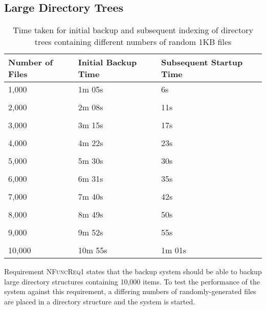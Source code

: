 \subsection{Large Directory Trees}

\begin{table}
    \centering
    \begin{tabular}{ l l l }
        Number of Files & Initial Backup Time   & Subsequent Startup Time
        \\ \toprule
        1,000           & 1m 05s                & 6s
        \\ \\
        2,000           & 2m 08s                & 11s
        \\ \\
        3,000           & 3m 15s                & 17s
        \\ \\
        4,000           & 4m 22s                & 23s
        \\ \\
        5,000           & 5m 30s                & 30s
        \\ \\
        6,000           & 6m 31s                & 35s
        \\ \\
        7,000           & 7m 40s                & 42s
        \\ \\
        8,000           & 8m 49s                & 50s
        \\ \\
        9,000           & 9m 52s                & 55s
        \\ \\
        10,000          & 10m 55s               & 1m 01s
        \\ \bottomrule
    \end{tabular}
    \caption{Time taken for initial backup and subsequent indexing of
    directory trees containing different numbers of random 1KB files}
    \label{tab:performance}
\end{table}

Requirement \textsc{NFuncReq1} states that the backup system should be able to
backup large directory structures containing 10,000 items. To test the
performance of the system against this requirement, a differing numbers of
randomly-generated files are placed in a directory structure and the system is
started.


